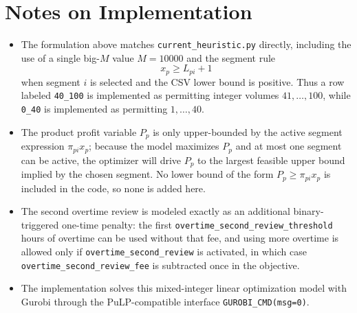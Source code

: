 \section*{Notes on Implementation}

\begin{itemize}
    \item The formulation above matches \texttt{current\_heuristic.py} directly, including the use of a single big-$M$ value $M=10000$ and the segment rule
    \[
    x_p \ge L_{pi}+1
    \]
    when segment $i$ is selected and the CSV lower bound is positive. Thus a row labeled \texttt{40\_100} is implemented as permitting integer volumes $41,\dots,100$, while \texttt{0\_40} is implemented as permitting $1,\dots,40$.
    \item The product profit variable $P_p$ is only upper-bounded by the active segment expression $\pi_{pi}x_p$; because the model maximizes $P_p$ and at most one segment can be active, the optimizer will drive $P_p$ to the largest feasible upper bound implied by the chosen segment. No lower bound of the form $P_p \ge \pi_{pi}x_p$ is included in the code, so none is added here.
    \item The second overtime review is modeled exactly as an additional binary-triggered one-time penalty: the first \texttt{overtime\_second\_review\_threshold} hours of overtime can be used without that fee, and using more overtime is allowed only if \texttt{overtime\_second\_review} is activated, in which case \texttt{overtime\_second\_review\_fee} is subtracted once in the objective.
    \item The implementation solves this mixed-integer linear optimization model with Gurobi through the PuLP-compatible interface \texttt{GUROBI\_CMD(msg=0)}.
\end{itemize}
